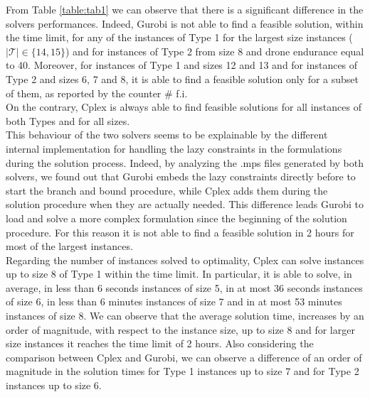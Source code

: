 \documentclass{itor}
\theoremstyle{definition}
\theoremstyle{remark}
\begin{document}
From Table \ref{table:tab1} we can observe that there is a significant difference in the solvers performances. Indeed, Gurobi is not able to find a feasible solution, within the time limit,  for any of  the instances of Type 1 for the largest size instances ($|\mathcal{T}|\in \{14,15\}$)  and for instances of Type 2 from size 8 and drone endurance equal to 40. Moreover, for instances of Type 1 and sizes 12 and 13 and for instances of Type 2 and sizes 6, 7 and 8, it is able to find a feasible solution only for a subset of them, as reported by the counter $\#$ f.i.\\
On the contrary, Cplex is always able to find  feasible solutions for all instances of both Types and for all sizes.\\
\indent This behaviour of the two solvers seems to be explainable by the different internal implementation for handling the lazy constraints in the formulations during the solution process. Indeed, by analyzing the .mps files generated by both solvers, we found out that Gurobi embeds the lazy constraints directly before to start  the branch and bound procedure, while Cplex adds them during the solution procedure when they are actually needed. This difference leads Gurobi to load and solve a more complex formulation since the beginning of the solution procedure. For this reason it is not able to find a feasible solution in 2 hours for most of the largest instances.\\
\indent Regarding the number of instances solved to optimality, Cplex can solve instances up to size 8 of Type 1 within the time limit. In particular, it is able to solve, in average, in less than 6 seconds instances of size 5, in at most 36 seconds instances of size 6, in less than 6 minutes instances of size 7 and in at most 53 minutes instances of size 8. We can observe that the average solution time, increases by an order of magnitude, with respect to the instance size,  up to size 8 and for larger size instances it reaches the time limit of 2 hours. Also considering the comparison between Cplex and Gurobi, we can observe a difference of an order of magnitude in the solution times for Type 1 instances up to size 7 and for Type 2 instances up to size 6.\\



 
\end{document}

